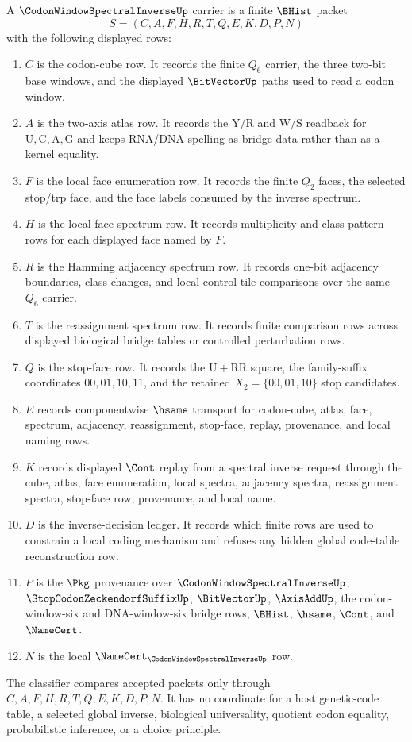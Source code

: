 \begin{definition}
\label{def:codon-window-spectral-inverse-carrier}
A $\CodonWindowSpectralInverseUp$ carrier is a finite $\BHist$ packet
$$
S=(C,A,F,H,R,T,Q,E,K,D,P,N)
$$
with the following displayed rows:
\begin{enumerate}
\item $C$ is the codon-cube row. It records the finite $Q_{6}$ carrier, the three two-bit base windows, and the displayed $\BitVectorUp$ paths used to read a codon window.
\item $A$ is the two-axis atlas row. It records the $\mathrm{Y}/\mathrm{R}$ and $\mathrm{W}/\mathrm{S}$ readback for $\mathrm{U},\mathrm{C},\mathrm{A},\mathrm{G}$ and keeps RNA/DNA spelling as bridge data rather than as a kernel equality.
\item $F$ is the local face enumeration row. It records the finite $Q_{2}$ faces, the selected stop/trp face, and the face labels consumed by the inverse spectrum.
\item $H$ is the local face spectrum row. It records multiplicity and class-pattern rows for each displayed face named by $F$.
\item $R$ is the Hamming adjacency spectrum row. It records one-bit adjacency boundaries, class changes, and local control-tile comparisons over the same $Q_{6}$ carrier.
\item $T$ is the reassignment spectrum row. It records finite comparison rows across displayed biological bridge tables or controlled perturbation rows.
\item $Q$ is the stop-face row. It records the $\mathrm{U}+\mathrm{RR}$ square, the family-suffix coordinates $00,01,10,11$, and the retained $X_{2}=\{00,01,10\}$ stop candidates.
\item $E$ records componentwise $\hsame$ transport for codon-cube, atlas, face, spectrum, adjacency, reassignment, stop-face, replay, provenance, and local naming rows.
\item $K$ records displayed $\Cont$ replay from a spectral inverse request through the cube, atlas, face enumeration, local spectra, adjacency spectra, reassignment spectra, stop-face row, provenance, and local name.
\item $D$ is the inverse-decision ledger. It records which finite rows are used to constrain a local coding mechanism and refuses any hidden global code-table reconstruction row.
\item $P$ is the $\Pkg$ provenance over $\CodonWindowSpectralInverseUp$, $\StopCodonZeckendorfSuffixUp$, $\BitVectorUp$, $\AxisAddUp$, the codon-window-six and DNA-window-six bridge rows, $\BHist$, $\hsame$, $\Cont$, and $\NameCert$.
\item $N$ is the local $\NameCert_{\CodonWindowSpectralInverseUp}$ row.
\end{enumerate}
The classifier compares accepted packets only through $C,A,F,H,R,T,Q,E,K,D,P,N$. It has no coordinate for a host genetic-code table, a selected global inverse, biological universality, quotient codon equality, probabilistic inference, or a choice principle.
\end{definition}
